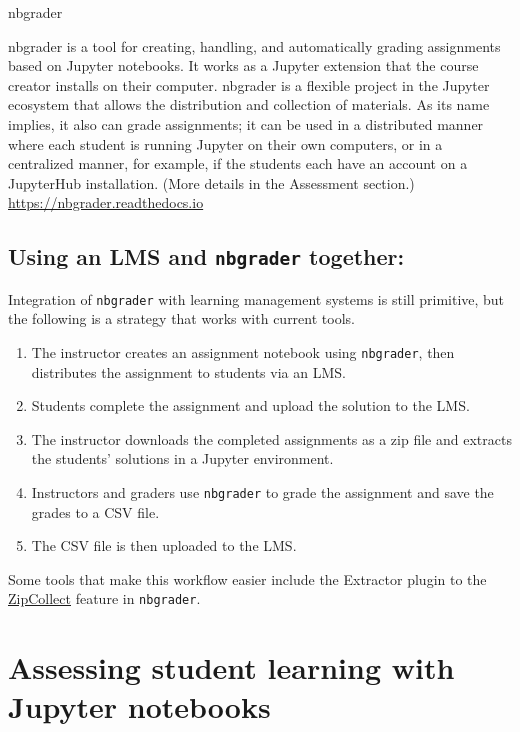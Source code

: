 \documentclass[]{book}
\begin{document}
nbgrader

nbgrader is a tool for creating, handling, and automatically grading
assignments based on Jupyter notebooks. It works as a Jupyter extension
that the course creator installs on their computer. nbgrader is a
flexible project in the Jupyter ecosystem that allows the distribution
and collection of materials. As its name implies, it also can grade
assignments; it can be used in a distributed manner where each student
is running Jupyter on their own computers, or in a centralized manner,
for example, if the students each have an account on a JupyterHub
installation. (More details in the Assessment section.)
\url{https://nbgrader.readthedocs.io}

\subsection{\texorpdfstring{Using an LMS and \texttt{nbgrader}
together:}{Using an LMS and nbgrader together:}}\label{using-an-lms-and-nbgrader-together}

Integration of \texttt{nbgrader} with learning management systems is
still primitive, but the following is a strategy that works with current
tools.

\begin{enumerate}
\def\labelenumi{\arabic{enumi}.}
\item
  The instructor creates an assignment notebook using \texttt{nbgrader},
  then distributes the assignment to students via an LMS.
\item
  Students complete the assignment and upload the solution to the LMS.
\item
  The instructor downloads the completed assignments as a zip file and
  extracts the students' solutions in a Jupyter environment.
\item
  Instructors and graders use \texttt{nbgrader} to grade the assignment
  and save the grades to a CSV file.
\item
  The CSV file is then uploaded to the LMS.
\end{enumerate}

Some tools that make this workflow easier include the Extractor plugin
to the
\href{https://nbgrader.readthedocs.io/en/stable/plugins/zipcollect-plugin.html}{ZipCollect}
feature in \texttt{nbgrader}.

\section{Assessing student learning with Jupyter
notebooks}\label{assessing-student-learning-with-jupyter-notebooks}
\end{document}
